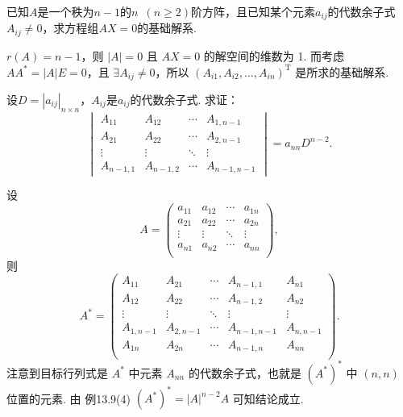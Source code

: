 \begin{exercise}
\begin{exgroup}
        \item 已知$A$是一个秩为$n-1$的$n\enspace(n \geqslant 2)$阶方阵，且已知某个元素$a_{ij}$的代数余子式$A_{ij} \neq 0$，求方程组$AX=0$的基础解系.
        \begin{answer}
            $r(A) = n-1$，则 $\lvert A \rvert = 0$ 且 $AX = 0$ 的解空间的维数为 1. 而考虑 $AA^* = \lvert A \rvert E = 0$，且 $\exists A_{ij} \neq 0$，所以 $(A_{i1}, A_{i2}, \ldots , A_{in})^{\mathrm{T}}$ 是所求的基础解系.
        \end{answer}

        \item 设$D=|a_{ij}|_{n \times n}$，$A_{ij}$是$a_{ij}$的代数余子式. 求证：
        \[\begin{vmatrix}
                A_{11}    & A_{12}    & \cdots & A_{1,n-1}   \\
                A_{21}    & A_{22}    & \cdots & A_{2,n-1}   \\
                \vdots    & \vdots    & \ddots & \vdots      \\
                A_{n-1,1} & A_{n-1,2} & \cdots & A_{n-1,n-1}
            \end{vmatrix}=a_{nn}D^{n-2}.\]
        \begin{answer}
            设 \[A = \begin{pmatrix}
                a_{11} & a_{12} & \cdots & a_{1n} \\
                a_{21} & a_{22} & \cdots & a_{2n} \\
                \vdots & \vdots & \ddots & \vdots \\
                a_{n1} & a_{n2} & \cdots & a_{nn} \\
            \end{pmatrix},\]
            则 \[A^* = \begin{pmatrix}
                    A_{11}     & A_{21}     & \cdots & A_{n-1, 1}   & A_{n1}     \\
                    A_{12}     & A_{22}     & \cdots & A_{n-1, 2}   & A_{n2}     \\
                    \vdots     & \vdots     & \ddots & \vdots       & \vdots     \\
                    A_{1, n-1} & A_{2, n-1} & \cdots & A_{n-1, n-1} & A_{n, n-1} \\
                    A_{1n}     & A_{2n}     & \cdots & A_{n-1, n}   & A_{nn}     \\
                \end{pmatrix}.\]
            注意到目标行列式是 $A^*$ 中元素 $A_{nn}$ 的代数余子式，也就是 $(A^*)^*$ 中 $(n, n)$ 位置的元素. 由 {例13.9(4)} $(A^*)^* = \lvert A \rvert^{n-2}A$ 可知结论成立. %
        \end{answer}


\end{exgroup}
\end{exercise}
